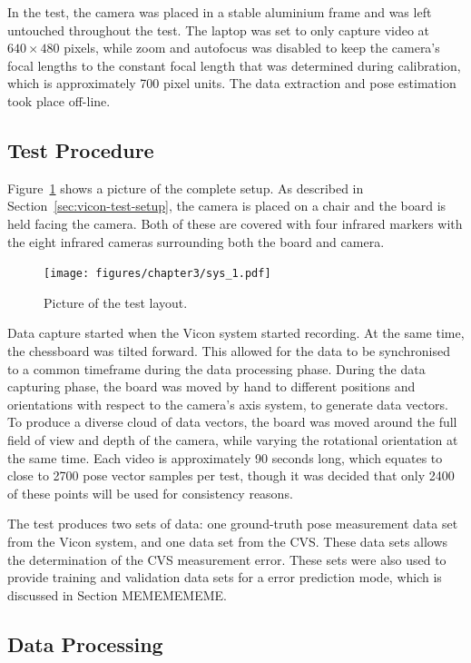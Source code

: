 In the test, the camera was placed in a stable aluminium frame and was left untouched throughout the test. The laptop was set to only capture video at $640\times480$ pixels, while zoom and autofocus was disabled to keep the camera's focal lengths to the constant focal length that was determined during calibration, which is approximately 700 pixel units. The data extraction and pose estimation took place off-line. 

\subsection{Test Procedure}

Figure~\ref{fig:pic-sys-layout} shows a picture of the complete setup. As described in Section~\ref{sec:vicon-test-setup}, the camera is placed on a chair and the board is held facing the camera. Both of these are covered with four infrared markers with the eight infrared cameras surrounding both the board and camera.  

\begin{figure}
  \centering
  \texttt{[image: figures/chapter3/sys\_1.pdf]}
  \caption{Picture of the test layout.}
\label{fig:pic-sys-layout}
\end{figure}

Data capture started when the Vicon system started recording. At the same time, the chessboard was tilted forward. This allowed for the data to be synchronised to a common timeframe during the data processing phase. During the data capturing phase, the board was moved by hand to different positions and orientations with respect to the camera's axis system, to generate data vectors. To produce a diverse cloud of data vectors, the board was moved around the full field of view and depth of the camera, while varying the rotational orientation at the same time. Each video is approximately 90 seconds long, which equates to close to 2700 pose vector samples per test, though it was decided that only 2400 of these points will be used for consistency reasons. 

The test produces two sets of data: one ground-truth pose measurement data set from the Vicon system, and one data set from the CVS\@. These data sets allows the determination of the CVS measurement error. These sets were also used to provide training and validation data sets for a error prediction mode, which is discussed in Section MEMEMEMEME.

\subsection{Data Processing}

